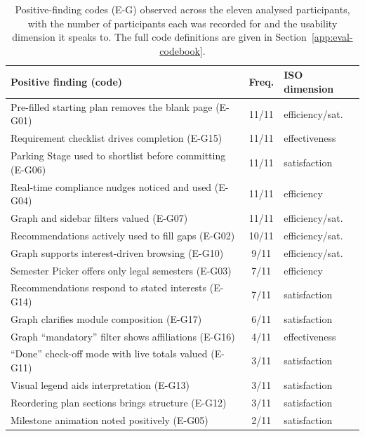 \begin{table}[htpb]
    \centering
    \small
    \begin{tabular}{p{8.6cm}cp{2.4cm}}
        \toprule
        Positive finding (code) & Freq. & ISO dimension \\
        \midrule
        Pre-filled starting plan removes the blank page (E-G01) & 11/11 & efficiency/sat. \\
        Requirement checklist drives completion (E-G15) & 11/11 & effectiveness \\
        Parking Stage used to shortlist before committing (E-G06) & 11/11 & satisfaction \\
        Real-time compliance nudges noticed and used (E-G04) & 11/11 & efficiency \\
        Graph and sidebar filters valued (E-G07) & 11/11 & efficiency/sat. \\
        Recommendations actively used to fill gaps (E-G02) & 10/11 & efficiency/sat. \\
        Graph supports interest-driven browsing (E-G10) & 9/11 & efficiency/sat. \\
        Semester Picker offers only legal semesters (E-G03) & 7/11 & efficiency \\
        Recommendations respond to stated interests (E-G14) & 7/11 & satisfaction \\
        Graph clarifies module composition (E-G17) & 6/11 & satisfaction \\
        Graph \enquote{mandatory} filter shows affiliations (E-G16) & 4/11 & effectiveness \\
        \enquote{Done} check-off mode with live totals valued (E-G11) & 3/11 & satisfaction \\
        Visual legend aids interpretation (E-G13) & 3/11 & satisfaction \\
        Reordering plan sections brings structure (E-G12) & 3/11 & satisfaction \\
        Milestone animation noted positively (E-G05) & 2/11 & satisfaction \\
        \bottomrule
    \end{tabular}
    \caption{Positive-finding codes (\mbox{E-G}) observed across the eleven analysed participants, with the number of participants each was recorded for and the usability dimension it speaks to. The full code definitions are given in Section~\ref{app:eval-codebook}.}
    \label{tab:positives}
\end{table}

